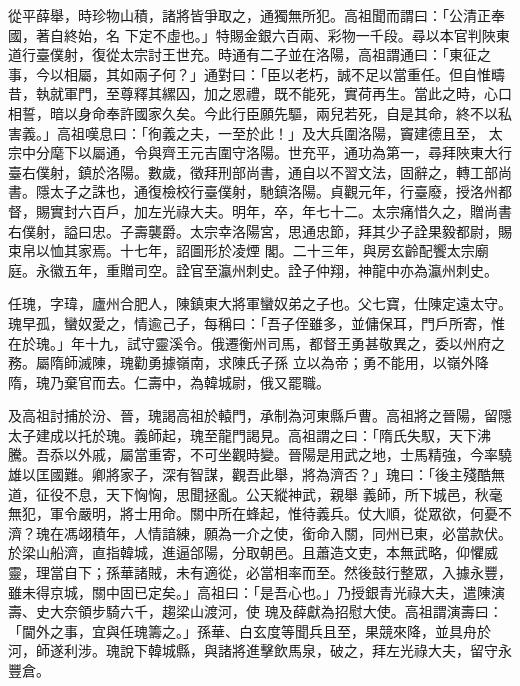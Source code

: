 \begin{pinyinscope}
 從平薛舉，時珍物山積，諸將皆爭取之，通獨無所犯。高祖聞而謂曰：「公清正奉國，著自終始，名
 下定不虛也。」特賜金銀六百兩、彩物一千段。尋以本官判陜東道行臺僕射，復從太宗討王世充。時通有二子並在洛陽，高祖謂通曰：「東征之事，今以相屬，其如兩子何？」通對曰：「臣以老朽，誠不足以當重任。但自惟疇昔，執就軍門，至尊釋其縲囚，加之恩禮，既不能死，實荷再生。當此之時，心口相誓，暗以身命奉許國家久矣。今此行臣願先驅，兩兒若死，自是其命，終不以私害義。」高祖嘆息曰：「徇義之夫，一至於此！」及大兵圍洛陽，竇建德且至，
 太宗中分麾下以屬通，令與齊王元吉圍守洛陽。世充平，通功為第一，尋拜陜東大行臺右僕射，鎮於洛陽。數歲，徵拜刑部尚書，通自以不習文法，固辭之，轉工部尚書。隱太子之誅也，通復檢校行臺僕射，馳鎮洛陽。貞觀元年，行臺廢，授洛州都督，賜實封六百戶，加左光祿大夫。明年，卒，年七十二。太宗痛惜久之，贈尚書右僕射，謚曰忠。子壽襲爵。太宗幸洛陽宮，思通忠節，拜其少子詮果毅都尉，賜束帛以恤其家焉。十七年，詔圖形於凌煙
 閣。二十三年，與房玄齡配饗太宗廟庭。永徽五年，重贈司空。詮官至瀛州刺史。詮子仲翔，神龍中亦為瀛州刺史。



 任瑰，字瑋，廬州合肥人，陳鎮東大將軍蠻奴弟之子也。父七寶，仕陳定遠太守。瑰早孤，蠻奴愛之，情逾己子，每稱曰：「吾子侄雖多，並傭保耳，門戶所寄，惟在於瑰。」年十九，試守靈溪令。俄遷衡州司馬，都督王勇甚敬異之，委以州府之務。屬隋師滅陳，瑰勸勇據嶺南，求陳氏子孫
 立以為帝；勇不能用，以嶺外降隋，瑰乃棄官而去。仁壽中，為韓城尉，俄又罷職。



 及高祖討捕於汾、晉，瑰謁高祖於轅門，承制為河東縣戶曹。高祖將之晉陽，留隱太子建成以托於瑰。義師起，瑰至龍門謁見。高祖謂之曰：「隋氏失馭，天下沸騰。吾忝以外戚，屬當重寄，不可坐觀時變。晉陽是用武之地，士馬精強，今率驍雄以匡國難。卿將家子，深有智謀，觀吾此舉，將為濟否？」瑰曰：「後主殘酷無道，征役不息，天下恟恟，思聞拯亂。公天縱神武，親舉
 義師，所下城邑，秋毫無犯，軍令嚴明，將士用命。關中所在蜂起，惟待義兵。仗大順，從眾欲，何憂不濟？瑰在馮翊積年，人情諳練，願為一介之使，銜命入關，同州已東，必當款伏。於梁山船濟，直指韓城，進逼郃陽，分取朝邑。且蕭造文吏，本無武略，仰懼威靈，理當自下；孫華諸賊，未有適從，必當相率而至。然後鼓行整眾，入據永豐，雖未得京城，關中固已定矣。」高祖曰：「是吾心也。」乃授銀青光祿大夫，遣陳演壽、史大奈領步騎六千，趨梁山渡河，使
 瑰及薛獻為招慰大使。高祖謂演壽曰：「閫外之事，宜與任瑰籌之。」孫華、白玄度等聞兵且至，果競來降，並具舟於河，師遂利涉。瑰說下韓城縣，與諸將進擊飲馬泉，破之，拜左光祿大夫，留守永豐倉。




\end{pinyinscope}
